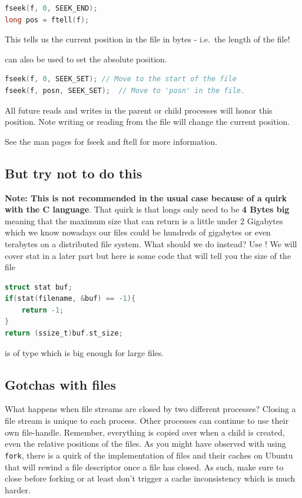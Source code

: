 \begin{lstlisting}[language=C]
fseek(f, 0, SEEK_END);
long pos = ftell(f);
\end{lstlisting}

This tells us the current position in the file in bytes - i.e.~the
length of the file!

 can also be used to set the absolute position.

\begin{lstlisting}[language=C]
fseek(f, 0, SEEK_SET); // Move to the start of the file 
fseek(f, posn, SEEK_SET);  // Move to 'posn' in the file.
\end{lstlisting}

All future reads and writes in the parent or child processes will honor
this position. Note writing or reading from the file will change the
current position.

See the man pages for fseek and ftell for more information.

\subsection{But try not to do this}

\textbf{Note: This is not recommended in the usual case because of a quirk with the C language}. That quirk is that longs only need to be \textbf{4 Bytes big} meaning that the maximum size that  can return is a little under 2 Gigabytes which we know nowadays our files could be hundreds of gigabytes or even terabytes on a distributed file system. What should we do instead? Use ! We will cover stat in a later part but here is some code that will tell you the size of the file

\begin{lstlisting}[language=C]
struct stat buf;
if(stat(filename, &buf) == -1){
    return -1;
}
return (ssize_t)buf.st_size;
\end{lstlisting}

 is of type  which is big enough for large files.

\subsection{Gotchas with files}

What happens when file streams are closed by two different processes? Closing a file stream is unique to each process. Other processes can continue to use their own file-handle. Remember, everything is copied over when a child is created, even the relative positions of the files. As you might have observed with using \texttt{fork}, there is a quirk of the implementation of files and their caches on Ubuntu that will rewind a file descriptor once a file has closed. As such, make sure to close before forking or at least don't trigger a cache inconsistency which is much harder.

